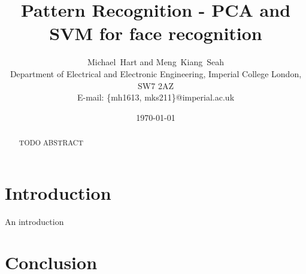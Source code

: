 \documentclass[a4paper, 10pt, conference]{ieeeconf}
\begin{document}
\title{Pattern Recognition - PCA and SVM for face recognition}
\author{Michael~Hart and
        Meng~Kiang~Seah
\\
        Department of Electrical and Electronic Engineering, 
        Imperial College London, 
        SW7 2AZ
 \\      
        E-mail: \{mh1613, mks211\}@imperial.ac.uk}
\date{\today}




\maketitle


\begin{abstract}
TODO ABSTRACT
\end{abstract}

\section{Introduction}

% 

An introduction

\section{Conclusion}
\end{document}
